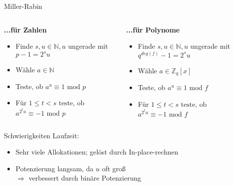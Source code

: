 \documentclass[german,10pt,xcolor=colortbl,compress]{beamer}%
\newcommand{\ZZ}{\mathbb{Z}}
\newcommand{\NN}{\mathbb{N}}
\begin{document}


	\begin{frame}{Miller-Rabin}
		
		\begin{columns}
			\begin{column}{0.5\textwidth}
				\textbf{...für Zahlen}
				\begin{itemize}
					\item Finde $s,u \in \NN,u $ ungerade mit $p-1=2^su $
					\item Wähle $a \in \NN$ 
					\item Teste, ob $a^u \equiv 1 \text{ mod } p$
					\item Für $1\leq t < s \text{ teste, ob }$\\$ a^{2^t u} \equiv -1 \text{ mod } p$
				\end{itemize}	
			\end{column}
			
		\begin{column}{0.5\textwidth}
			\textbf{...für Polynome}
		\begin{itemize}
			\item Finde $s,u \in \NN,u $ ungerade mit $q^{deg(f)}-1=2^su $
			\item Wähle $a \in \ZZ_q[x]$ 
			\item Teste, ob $a^u \equiv 1 \text{ mod } f$
			\item Für $1\leq t < s \text{ teste, ob } $\\$a^{2^t u} \equiv -1 \text{ mod } f$	
		\end{itemize}
	\end{column}
	\end{columns}		
	\end{frame}


	\begin{frame}{Schwierigkeiten}
		Laufzeit: 
		
		\begin{itemize}
			\item Sehr viele Allokationen; gelöst durch In-place-rechnen
			\item Potenzierung langsam, da $u$ oft groß \\
			$\Rightarrow$ verbessert durch binäre Potenzierung
		\end{itemize}
	\end{frame}
\end{document}
